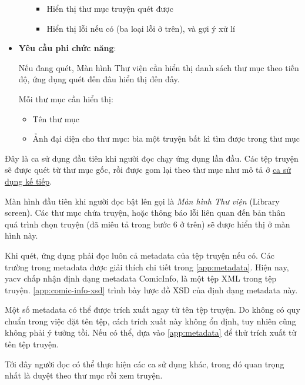 \documentclass[../../thesis]{subfiles}
\begin{document}
\begin{itemize}
\begin{itemize}
                \begin{itemize}
                    \item
                        Hiển thị thư mục truyện quét được
                    \item
                        Hiển thị lỗi nếu có (ba loại lỗi ở trên), và gợi ý xử lí
                \end{itemize}
          \end{itemize}
    \item
        \textbf{Yêu cầu phi chức năng}:

        Nếu đang quét, Màn hình Thư viện cần hiển thị danh sách thư mục theo
        tiến độ, ứng dụng quét đến đâu hiển thị đến đấy.

        Mỗi thư mục cần hiển thị:

        \begin{itemize}
            \item
                Tên thư mục
            \item
                Ảnh đại diện cho thư mục: bìa một truyện bất kì tìm được trong
                thư mục
        \end{itemize}
\end{itemize}

Đây là ca sử dụng đầu tiên khi người đọc chạy ứng dụng lần đầu. Các tệp truyện
sẽ được quét từ thư mục gốc, rồi được gom lại theo thư mục như mô tả ở
\hyperref[sec:show-library]{ca sử dụng kế tiếp}.

Màn hình đầu tiên khi người đọc bật lên gọi là \emph{Màn hình Thư viện} (Library
screen). Các thư mục chứa truyện, hoặc thông báo lỗi liên quan đến bản thân quá
trình chọn truyện (đã miêu tả trong bước 6 ở trên) sẽ được hiển thị ở màn hình
này.

Khi quét, ứng dụng phải đọc luôn cả metadata của tệp truyện nếu có. Các trường
trong metadata được giải thích chi tiết trong \autoref{app:metadata}. Hiện nay,
yacv chấp nhận định dạng metadata ComicInfo, là một tệp XML trong tệp truyện.
\autoref{app:comic-info-xsd} trình bày lược đồ XSD của định dạng metadata này.

Một số metadata có thể được trích xuất ngay từ tên tệp truyện. Do không có quy
chuẩn trong việc đặt tên tệp, cách trích xuất này không ổn định, tuy nhiên cũng
không phải ý tưởng tồi. Nếu có thể, dựa vào \autoref{app:metadata} để thử trích
xuất từ tên tệp truyện.

Tới đây người đọc có thể thực hiện các ca sử dụng khác, trong đó quan trọng nhất
là duyệt theo thư mục rồi xem truyện.
\end{document}
